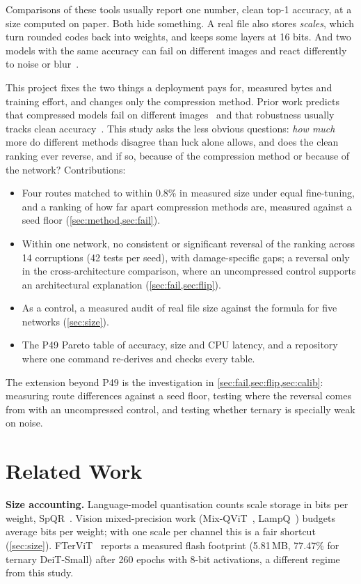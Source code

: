 \documentclass[10pt,twocolumn,letterpaper]{article}
\begin{document}
Comparisons of these tools usually report one number, clean top-1 accuracy, at a size computed on paper. Both hide something. A real file also stores \emph{scales}, which turn rounded codes back into weights, and keeps some layers at 16 bits. And two models with the same accuracy can fail on different images and react differently to noise or blur~\cite{hooker2019forget}.

This project fixes the two things a deployment pays for, measured bytes and training effort, and changes only the compression method. Prior work predicts that compressed models fail on different images~\cite{hooker2019forget} and that robustness usually tracks clean accuracy~\cite{miller2021line}. This study asks the less obvious questions: \emph{how much} more do different methods disagree than luck alone allows, and does the clean ranking ever reverse, and if so, because of the compression method or because of the network? Contributions:
\begin{itemize}\setlength\itemsep{0pt}
\item Four routes matched to within 0.8\% in measured size under equal fine-tuning, and a ranking of how far apart compression methods are, measured against a seed floor (\cref{sec:method,sec:fail}).
\item Within one network, no consistent or significant reversal of the ranking across 14 corruptions (42 tests per seed), with damage-specific gaps; a reversal only in the cross-architecture comparison, where an uncompressed control supports an architectural explanation (\cref{sec:fail,sec:flip}).
\item As a control, a measured audit of real file size against the formula for five networks (\cref{sec:size}).
\item The P49 Pareto table of accuracy, size and CPU latency, and a repository where one command re-derives and checks every table.
\end{itemize}
The extension beyond P49 is the investigation in \cref{sec:fail,sec:flip,sec:calib}: measuring route differences against a seed floor, testing where the reversal comes from with an uncompressed control, and testing whether ternary is specially weak on noise.

\section{Related Work}
\label{sec:related}
\textbf{Size accounting.} Language-model quantisation counts scale storage in bits per weight, \eg SpQR~\cite{dettmers2023spqr}. Vision mixed-precision work (Mix-QViT~\cite{ranjan2025mixqvit}, LampQ~\cite{kim2026lampq}) budgets average bits per weight; with one scale per channel this is a fair shortcut (\cref{sec:size}). FTerViT~\cite{rucinski2026ftervit} reports a measured flash footprint (5.81\,MB, 77.47\% for ternary DeiT-Small) after 260 epochs with 8-bit activations, a different regime from this study.
\end{document}
